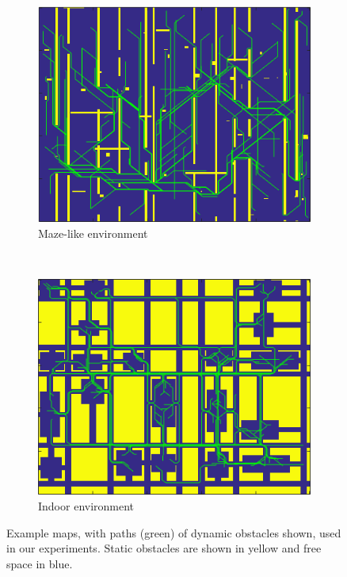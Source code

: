 \begin{figure}[ht]
  \centering
  \begin{subfigure}[t]{0.45\linewidth}
    \centering
    \includegraphics[width=\linewidth]{Figures/dyn.png}
    \caption{Maze-like environment}
  \end{subfigure}
  ~
  \begin{subfigure}[t]{0.45\linewidth}
    \centering
    \includegraphics[width=\linewidth]{Figures/indoor.png}
    \caption{Indoor environment}
  \end{subfigure}
  \caption{Example maps, with paths (green) of dynamic obstacles shown, used in our experiments. Static obstacles are shown in yellow and free space in blue.}
  \label{fig:env}
\end{figure}
 
